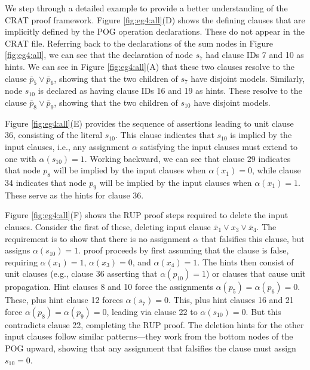 \documentclass[letterpaper,USenglish,cleveref, autoref, thm-restate]{lipics-v2021}
\newcommand{\obar}[1]{\overline{#1}}
\newcommand{\assign}{\alpha}
\begin{document}
We step through a detailed example to provide a better understanding of the CRAT proof framework.
Figure
\ref{fig:eg4:all}(D) shows the defining clauses that are implicitly
defined by the POG operation declarations.  These do not appear in the
CRAT file.  Referring back to the declarations of the sum nodes in
Figure \ref{fig:eg4:all}, we can see that the declaration of node
$s_7$ had clause IDs 7 and 10 as hints.  We can see in Figure
\ref{fig:eg4:all}(A) that these two clauses resolve to the clause
$\obar{p}_5 \lor \obar{p}_6$, showing that the two children of $s_7$
have disjoint models.  Similarly, node $s_{10}$ is declared as having
clause IDs 16 and 19 as hints.  These resolve to the clause
$\obar{p}_8 \lor \obar{p}_9$, showing that the two children of
$s_{10}$ have disjoint models.

Figure \ref{fig:eg4:all}(E) provides the sequence of assertions
leading to unit clause 36, consisting of the literal $s_{10}$.  This clause indicates that $s_{10}$ is implied by the input clauses, i.e.,
any assignment $\assign$
satisfying the input clauses must extend to one with $\assign(s_{10}) = 1$.
Working backward, we can see that
clause 29 indicates that node $p_8$ will be implied by the input
clauses when $\assign(x_1) = 0$, while clause 34 indicates that node $p_9$ will
be implied by the input clauses when $\assign(x_1) = 1$.  These serve as the
hints for clause 36.

Figure \ref{fig:eg4:all}(F) shows the RUP proof steps required to
delete the input clauses.  Consider the first of these, deleting
input clause $\obar{x}_1 \lor x_3 \lor \obar{x}_4$.  The requirement is to show
that there is no assignment $\assign$ that falsifies this clause, but assigns $\assign(s_{10}) = 1$.
proof proceeds by first assuming that the clause is false, requiring
$\assign(x_1) = 1$, $\assign(x_3) = 0$, and $\assign(x_4) = 1$.  The hints then consist of unit
clauses (e.g., clause 36 asserting that $\alpha(p_{10}) = 1$) or
clauses that cause unit propagation.  Hint clauses 8 and 10 force the
assignments $\assign(p_5) = \assign(p_6) = 0$.  These, plus hint clause 12 forces
$\assign(s_7) = 0$.  This, plus hint clauses 16 and 21 force $\assign(p_8) = \assign(p_9) = 0$, leading
via clause 22 to $\assign(s_10) = 0$.  But this contradicts clause 22,
completing the RUP proof.  The deletion hints for the other input
clauses follow similar patterns---they work from the bottom nodes of
the POG upward, showing that any assignment that falsifies the clause
must assign $s_{10} = 0$.
\end{document}

